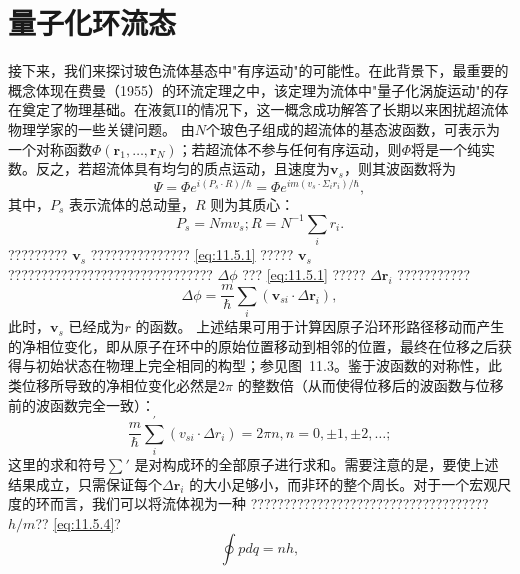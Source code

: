 \section{量子化环流态}\label{ux91cfux5b50ux5316ux73afux6d41ux6001}
接下来，我们来探讨玻色流体基态中"有序运动"的可能性。在此背景下，最重要的概念体现在费曼（1955）的环流定理之中，该定理为流体中"量子化涡旋运动"的存在奠定了物理基础。在液氦II的情况下，这一概念成功解答了长期以来困扰超流体物理学家的一些关键问题。
由\(N\)个玻色子组成的超流体的基态波函数，可表示为一个对称函数\(\Phi(\boldsymbol{r}_1,\ldots,\boldsymbol{r}_N)\)；若超流体不参与任何有序运动，则\(\Phi\)将是一个纯实数。反之，若超流体具有均匀的质点运动，且速度为\(\boldsymbol{v}_s\)，则其波函数将为
\begin{equation}\tag{11.5.1}\label{eq:11.5.1}
\Psi = \Phi e ^{i ( P _ { s} \cdot R ) / \hbar } = \Phi e ^{i m ( v _ { s} \cdot \Sigma _ { i } r _ { i } ) / \hbar } ,
\end{equation}
其中，\(P_{s}\) 表示流体的总动量，\(R\) 则为其质心：
\begin{equation}\tag{11.5.2}\label{eq:11.5.2}
P _ { s } = N m v _ { s } ;  R = N ^{- 1} \sum _ { i } r _ { i } .
\end{equation}
????????? \(\boldsymbol{v}_{s}\) ??????????????? \autoref{eq:11.5.1} ????? \(\boldsymbol{v}_{s}\) ??????????????????????????????? \(\Delta\phi\) ??? \autoref{eq:11.5.1} ????? \(\Delta\boldsymbol{r}_{i}\) ???????????
\begin{equation}\tag{11.5.3}\label{eq:11.5.3}
\Delta \phi = \frac { m } { \hbar } \sum _ { i } ( \pmb { v } _ { s i } \cdot \Delta \pmb { r } _ { i } ) ,
\end{equation}
此时，\(\boldsymbol{v}_{s}\) 已经成为\(r\) 的函数。
上述结果可用于计算因原子沿环形路径移动而产生的净相位变化，即从原子在环中的原始位置移动到相邻的位置，最终在位移之后获得与初始状态在物理上完全相同的构型；参见图~11.3。鉴于波函数的对称性，此类位移所导致的净相位变化必然是\(2\pi\) 的整数倍（从而使得位移后的波函数与位移前的波函数完全一致）：
\begin{equation}\tag{11.5.4}\label{eq:11.5.4}
\frac { m } { \hbar } \sum _ { i } ^{\prime} ( v _ { s i } \cdot \Delta r _ { i } ) = 2 \pi n ,  n = 0 , \pm 1 , \pm 2 , \ldots ;
\end{equation}
这里的求和符号\(\sum'\) 是对构成环的全部原子进行求和。需要注意的是，要使上述结果成立，只需保证每个\(\Delta\boldsymbol{r}_{i}\) 的大小足够小，而非环的整个周长。对于一个宏观尺度的环而言，我们可以将流体视为一种
???????????????????????????????????? \(h/m\)?? \autoref{eq:11.5.4}?
\begin{equation}\tag{11.5.5}\label{eq:11.5.5}
\oint p d q = n h ,
\end{equation}
